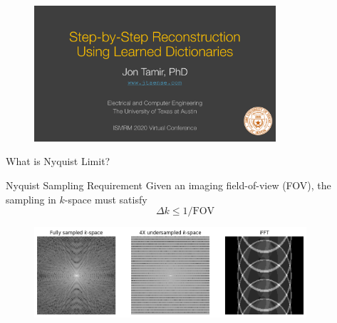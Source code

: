 \begin{frame}
    \begin{figure}
        \includegraphics[page=5, width=0.8\textwidth]{fig/learned_dictionaries.pdf}
    \end{figure}
\end{frame}


\begin{frame}{What is Nyquist Limit?}

	\begin{block}{Nyquist Sampling Requirement}
		{\large
		Given an imaging field-of-view (FOV), the sampling in $k$-space must satisfy
		\begin{equation}
			\Delta k \leq 1/\mathrm{FOV}
		\end{equation}}
	\end{block}

	\begin{figure}
		\includegraphics[width=0.9\textwidth]{fig/Nyquist.png}
	\end{figure}

\end{frame}



